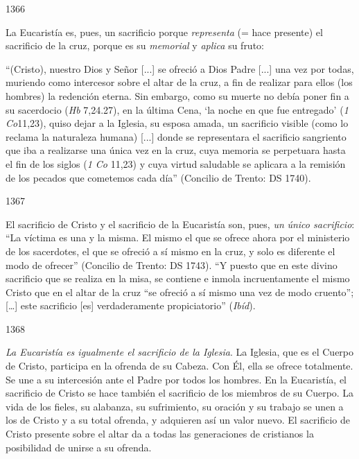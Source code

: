 			\begin{ccebody}\begin{ccenumber}1366\end{ccenumber} La Eucaristía es, pues, un sacrificio porque \textit{representa} (= hace presente) el sacrificio de la cruz, porque es su \textit{memorial} y \textit{aplica} su fruto:\end{ccebody}
			
			\begin{ccecite}“(Cristo), nuestro Dios y Señor [...] se ofreció a Dios Padre [...] una vez por todas, muriendo como intercesor sobre el altar de la cruz, a fin de realizar para ellos (los hombres) la redención eterna. Sin embargo, como su muerte no debía poner fin a su sacerdocio (\textit{Hb} 7,24.27), en la última Cena, ‘la noche en que fue entregado’ (\textit{1 Co}11,23), quiso dejar a la Iglesia, su esposa amada, un sacrificio visible (como lo reclama la naturaleza humana) [...] donde se representara el sacrificio sangriento que iba a realizarse una única vez en la cruz, cuya memoria se perpetuara hasta el fin de los siglos (\textit{1 Co} 11,23) y cuya virtud saludable se aplicara a la remisión de los pecados que cometemos cada día” (Concilio de Trento: DS 1740).\end{ccecite}
			
			\begin{ccebody}\begin{ccenumber}1367\end{ccenumber} El sacrificio de Cristo y el sacrificio de la Eucaristía son, pues, \textit{un} \textit{único sacrificio}: “La víctima es una y la misma. El mismo el que se ofrece ahora por el ministerio de los sacerdotes, el que se ofreció a sí mismo en la cruz, y solo es diferente el modo de ofrecer” (Concilio de Trento: DS 1743). “Y puesto que en este divino sacrificio que se realiza en la misa, se contiene e inmola incruentamente el mismo Cristo que en el altar de la cruz “se ofreció a sí mismo una vez de modo cruento”; […] este sacrificio [es] verdaderamente propiciatorio” (\textit{Ibíd}).\end{ccebody}
			
			\begin{ccebody}\begin{ccenumber}1368\end{ccenumber} \textit{La Eucaristía es igualmente el sacrificio de la Iglesia}. La Iglesia, que es el Cuerpo de Cristo, participa en la ofrenda de su Cabeza. Con Él, ella se ofrece totalmente. Se une a su intercesión ante el Padre por todos los hombres. En la Eucaristía, el sacrificio de Cristo se hace también el sacrificio de los miembros de su Cuerpo. La vida de los fieles, su alabanza, su sufrimiento, su oración y su trabajo se unen a los de Cristo y a su total ofrenda, y adquieren así un valor nuevo. El sacrificio de Cristo presente sobre el altar da a todas las generaciones de cristianos la posibilidad de unirse a su ofrenda.\end{ccebody}
			
